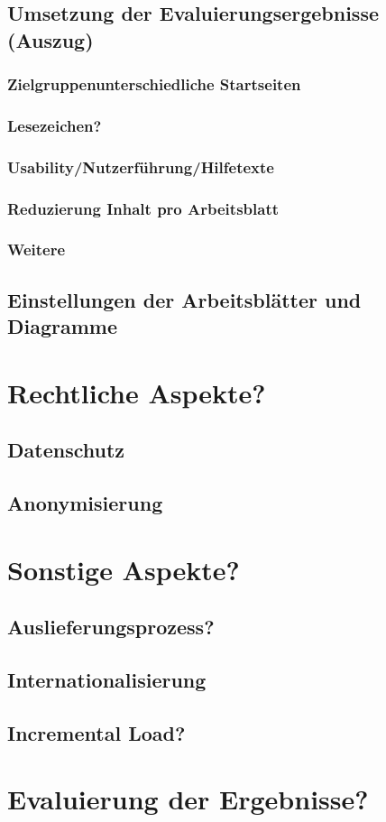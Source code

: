\subsection{Umsetzung der Evaluierungsergebnisse (Auszug)}
\subsubsection{Zielgruppenunterschiedliche Startseiten}
\subsubsection{Lesezeichen?} %
\subsubsection{Usability/Nutzerführung/Hilfetexte}
\subsubsection{Reduzierung Inhalt pro Arbeitsblatt}
\subsubsection{Weitere}

\subsection{Einstellungen der Arbeitsblätter und Diagramme}

\section{Rechtliche Aspekte?}
\label{sec:recht}
\subsection{Datenschutz}
\subsection{Anonymisierung}


\section{Sonstige Aspekte?}
\subsection{Auslieferungsprozess?}
\subsection{Internationalisierung}
\subsection{Incremental Load?}
\label{sub:incremental}


\section{Evaluierung der Ergebnisse?}
